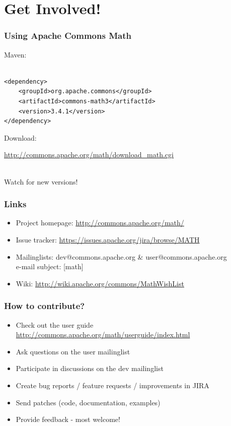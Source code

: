 \documentclass[14pt,mathserif]{beamer}
\begin{document}
\section[Getting involved]{Get Involved!}
\begin{frame}[fragile]
  \frametitle{Using Apache Commons Math}

Maven:

\begin{verbatim}

<dependency>
	<groupId>org.apache.commons</groupId>
	<artifactId>commons-math3</artifactId>
	<version>3.4.1</version>
</dependency>
\end{verbatim}

Download:\\
\begin{small}
\url{http://commons.apache.org/math/download_math.cgi} \\
\end{small}
\\
Watch for new versions!           
\end{frame}

\begin{frame}
  \frametitle{Links}

\begin{itemize}
  \item Project homepage: \url{http://commons.apache.org/math/}
  \item Issue tracker: \url{https://issues.apache.org/jira/browse/MATH}
  \item Mailinglists: dev@commons.apache.org \& user@commons.apache.org \\
  e-mail subject: [math]
  \item Wiki: \url{http://wiki.apache.org/commons/MathWishList}
\end{itemize}

\end{frame}

\begin{frame}
  \frametitle{How to contribute?}

\begin{itemize}
  \item Check out the user guide \url{http://commons.apache.org/math/userguide/index.html}
  \item Ask questions on the user mailinglist
  \item Participate in discussions on the dev mailinglist
  \item Create bug reports / feature requests / improvements in JIRA
  \item Send patches (code, documentation, examples)
  \item Provide feedback - most welcome!
\end{itemize}

\end{frame}
\end{document}
